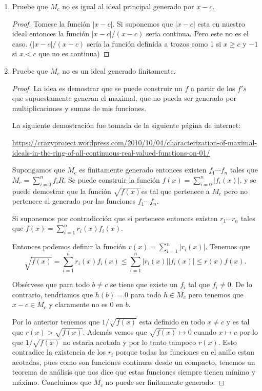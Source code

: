 \documentclass[letter,twoside,12pt]{article}
\begin{document}
\begin{enumerate}[label=\textbf{(\alph*)}]
\item Pruebe que $M_c$ no es igual al ideal principal generado por $x-c$.

\begin{proof}
Tomese la funci\'on $|x-c|$. Si suponemos que $|x-c|$ esta en nuestro ideal entonces la funci\'on $|x-c|/(x-c)$ seria continua. Pero este no es el caso. ($|x-c|/(x-c)$ ser\'ia la funci\'on definida a trozos como 1 si $x \geq c$ y $-1$ si $x < c$ que no es continua)
\end{proof}

\item Pruebe que $M_c$ no es un ideal generado finitamente.
\begin{proof}
La idea es demostrar que se puede construir un $f$ a partir de los $f's$ que supuestamente generan el maximal, que no pueda ser generado por multiplicaciones y sumas de mis funciones.

La siguiente demostraci\'on fue tomada de la siguiente p\'agina de internet: 

\url{https://crazyproject.wordpress.com/2010/10/04/characterization-of-maximal-ideals-in-the-ring-of-all-continuous-real-valued-functions-on-01/}

Supongamos que $M_c$ es finitamente generado entonces existen $f_1 \cdots f_n$ tales que $M_c= \sum_{i=0}^n f_iR$. Se puede construir la funci\'on $f(x)={\sum_{i=0}^n|f_i(x)|}$, y se puede demostrar que la funci\'on $\sqrt{f(x)}$es tal que pertenece a $M_c$ pero no pertenece al generado por las funciones $f_1 \cdots f_n$.

Si suponemos por contradicci\'on que si pertenece entonces existen $r_1 \cdots r_n$ tales que $f(x)=\sum_{i=1}^n r_i(x)f_i(x).$

Entonces podemos definir la funci\'on $r(x)= \sum_{i=1}^n |r_i(x)|$. Tenemos que
\begin{equation}
\sqrt{f(x)}= \sum_{i=1}^n r_i(x)f_i(x)\leq \sum_{i=1}^n |r_i(x)||f_i(x)|\leq r(x)f(x). \nonumber
\end{equation}

Obs\'ervese que para todo $b \not = c$ se tiene que existe un $f_i$ tal que $f_i \not = 0$. De lo contrario, tendriamos que $h(b)=0$ para todo $h \in M_c$ pero tenemos que $x-c \in M_c$ y claramente no es $0$ en $b$.

Por lo anterior tenemos que $1/\sqrt{f(x)}$ esta definido en todo $x \not = c$ y es tal que $r(x)>\sqrt{f(x)}$. Adem\'as vemos que $\sqrt{f(x)} \mapsto 0$ cuando $x \mapsto c$ por lo que $1/\sqrt{f(x)}$ no estaria acotada y por lo tanto tampoco $r(x)$. Esto contradice la existencia de los $r_i$ porque todas las funciones en el anillo estan acotadas, pues como son funciones continuas desde un compacto, tenemos un teorema de an\'alisis que nos dice que estas funciones siempre tienen m\'inimo y m\'aximo. Concluimos que $M_c$ no puede ser finitamente generado.
\end{proof}
\end{enumerate}
\end{document}
